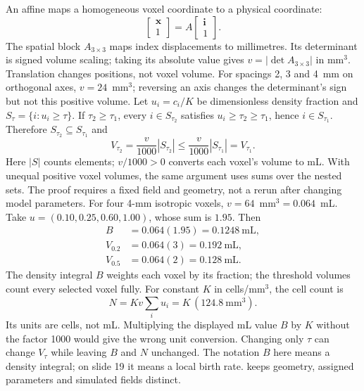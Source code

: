 An affine maps a homogeneous voxel coordinate to a physical coordinate:
\[
\begin{bmatrix}\mathbf x\\1\end{bmatrix}
=A\begin{bmatrix}\mathbf i\\1\end{bmatrix}.
\]
The spatial block $A_{3\times3}$ maps index displacements to millimetres. Its determinant is signed volume scaling; taking its absolute value gives $v=|\det A_{3\times3}|$ in mm$^3$. Translation changes positions, not voxel volume. For spacings 2, 3 and 4~mm on orthogonal axes, $v=24$~mm$^3$; reversing an axis changes the determinant's sign but not this positive volume.
Let $u_i=c_i/K$ be dimensionless density fraction and $S_\tau=\{i:u_i\geq\tau\}$. If $\tau_2\geq\tau_1$, every $i\in S_{\tau_2}$ satisfies $u_i\geq\tau_2\geq\tau_1$, hence $i\in S_{\tau_1}$. Therefore $S_{\tau_2}\subseteq S_{\tau_1}$ and
\[
V_{\tau_2}=\frac v{1000}|S_{\tau_2}|
\leq\frac v{1000}|S_{\tau_1}|=V_{\tau_1}.
\]
Here $|S|$ counts elements; $v/1000>0$ converts each voxel's volume to mL. With unequal positive voxel volumes, the same argument uses sums over the nested sets. The proof requires a fixed field and geometry, not a rerun after changing model parameters.
For four 4-mm isotropic voxels, $v=64$~mm$^3=0.064$~mL. Take $u=(0.10,0.25,0.60,1.00)$, whose sum is $1.95$. Then
\[
\begin{aligned}
B&=0.064(1.95)=0.1248\ \mathrm{mL},\\
V_{0.2}&=0.064(3)=0.192\ \mathrm{mL},\\
V_{0.5}&=0.064(2)=0.128\ \mathrm{mL}.
\end{aligned}
\]
The density integral $B$ weights each voxel by its fraction; the threshold volumes count every selected voxel fully. For constant $K$ in cells/mm$^3$, the cell count is
\[
N=Kv\sum_i u_i=K\,(124.8\ \mathrm{mm}^3).
\]
Its units are cells, not mL. Multiplying the displayed mL value $B$ by $K$ without the factor 1000 would give the wrong unit conversion.
Changing only $\tau$ can change $V_\tau$ while leaving $B$ and $N$ unchanged. The notation $B$ here means a density integral; on slide 19 it means a local birth rate.  keeps geometry, assigned parameters and simulated fields distinct.

